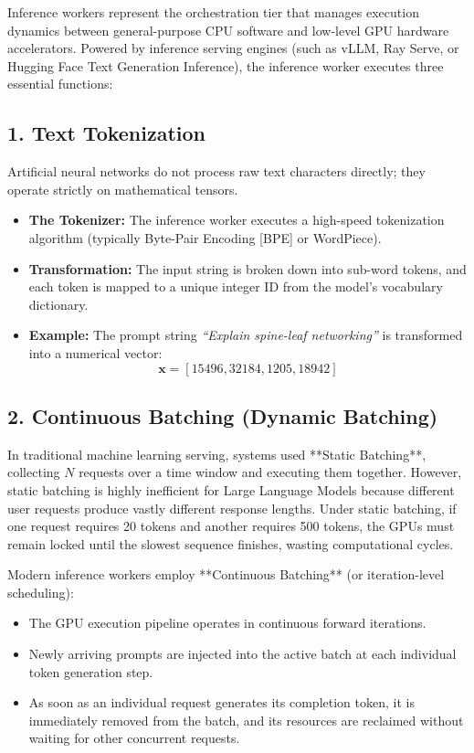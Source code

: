 \documentclass[12pt,a4paper]{report}
\begin{document}
Inference workers represent the orchestration tier that manages execution dynamics between general-purpose CPU software and low-level GPU hardware accelerators. Powered by inference serving engines (such as vLLM, Ray Serve, or Hugging Face Text Generation Inference), the inference worker executes three essential functions:

\subsection{1. Text Tokenization}
Artificial neural networks do not process raw text characters directly; they operate strictly on mathematical tensors.
\begin{itemize}[leftmargin=1.2cm]
    \item \textbf{The Tokenizer:} The inference worker executes a high-speed tokenization algorithm (typically Byte-Pair Encoding [BPE] or WordPiece).
    \item \textbf{Transformation:} The input string is broken down into sub-word tokens, and each token is mapped to a unique integer ID from the model's vocabulary dictionary.
    \item \textbf{Example:} The prompt string \textit{``Explain spine-leaf networking''} is transformed into a numerical vector:
    \begin{equation}
        \mathbf{x} = [15496, 32184, 1205, 18942]
    \end{equation}
\end{itemize}

\subsection{2. Continuous Batching (Dynamic Batching)}
In traditional machine learning serving, systems used **Static Batching**, collecting $N$ requests over a time window and executing them together. However, static batching is highly inefficient for Large Language Models because different user requests produce vastly different response lengths. Under static batching, if one request requires 20 tokens and another requires 500 tokens, the GPUs must remain locked until the slowest sequence finishes, wasting computational cycles.

Modern inference workers employ **Continuous Batching** (or iteration-level scheduling):
\begin{itemize}[leftmargin=1.2cm]
    \item The GPU execution pipeline operates in continuous forward iterations.
    \item Newly arriving prompts are injected into the active batch at each individual token generation step.
    \item As soon as an individual request generates its completion token, it is immediately removed from the batch, and its resources are reclaimed without waiting for other concurrent requests.
\end{itemize}
\end{document}
